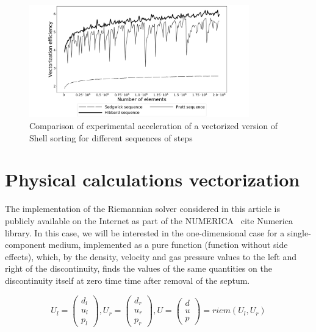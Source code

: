 \documentclass[
11pt,%
tightenlines,%
twoside,%
onecolumn,%
nofloats,%
nobibnotes,%
nofootinbib,%
superscriptaddress,%
noshowpacs,%
centertags]%
{revtex4}
\begin{document}
\begin{figure}[h]
\setcaptionmargin{5mm}
\onelinecaptionstrue  %
\includegraphics[width=0.85\textwidth]{pics/theoretical_eff.pdf}
\caption{Comparison of experimental acceleration of a vectorized version of Shell sorting for different sequences of steps}\label{fig:1}
\end{figure}


\section{Physical calculations vectorization}

The implementation of the Riemannian solver considered in this article is publicly available on the Internet as part of the NUMERICA \ cite {Numerica} library. In this case, we will be interested in the one-dimensional case for a single-component medium, implemented as a pure function (function without side effects), which, by the density, velocity and gas pressure values to the left and right of the discontinuity, finds the values of the same quantities on the discontinuity itself at zero time time after removal of the septum.

\begin{equation}\label{eq:riemann}
U_l = \left( \begin{array}{ccc} d_l \\ u_l \\ p_l \end{array} \right),
U_r = \left( \begin{array}{ccc} d_r \\ u_r \\ p_r \end{array} \right),
U = \left( \begin{array}{ccc} d \\ u \\ p \end{array} \right) = riem(U_l, U_r)
\end{equation}
\end{document}
